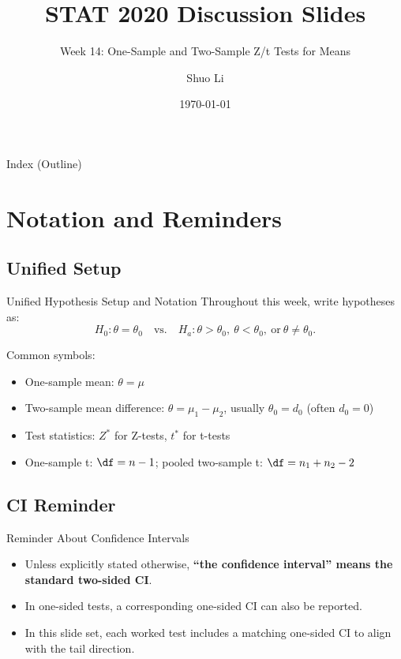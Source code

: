 \documentclass[aspectratio=169]{beamer}
\title[STAT 2020 Week 14 \hfill \insertframenumber/\inserttotalframenumber]{STAT 2020 Discussion Slides}
\subtitle{Week 14: One-Sample and Two-Sample Z/t Tests for Means}
\author{Shuo Li}
\institute{University of Iowa}
\date{\today}
\begin{document}
\begin{frame}
  \titlepage
\end{frame}

\begin{frame}[allowframebreaks]{Index (Outline)}
  \tableofcontents[hideallsubsections]
\end{frame}

\section{Notation and Reminders}

\subsection{Unified Setup}
\begin{frame}{Unified Hypothesis Setup and Notation}
  Throughout this week, write hypotheses as:
  \[
    H_0: \theta = \theta_0
    \quad\text{vs.}\quad
    H_a: \theta > \theta_0,\ \theta < \theta_0,\ \text{or}\ \theta \ne \theta_0.
  \]

  \vspace{1mm}
  Common symbols:
  \begin{itemize}
    \item One-sample mean: \(\theta=\mu\)
    \item Two-sample mean difference: \(\theta=\mu_1-\mu_2\), usually \(\theta_0=d_0\) (often \(d_0=0\))
    \item Test statistics: \(Z^*\) for Z-tests, \(t^*\) for t-tests
    \item One-sample t: \(\df=n-1\); pooled two-sample t: \(\df=n_1+n_2-2\)
  \end{itemize}
\end{frame}

\subsection{CI Reminder}
\begin{frame}{Reminder About Confidence Intervals}
  \begin{itemize}
    \item Unless explicitly stated otherwise, \textbf{``the confidence interval'' means the standard two-sided CI}.
    \item In one-sided tests, a corresponding one-sided CI can also be reported.
    \item In this slide set, each worked test includes a matching one-sided CI to align with the tail direction.
  \end{itemize}
\end{frame}
\end{document}
